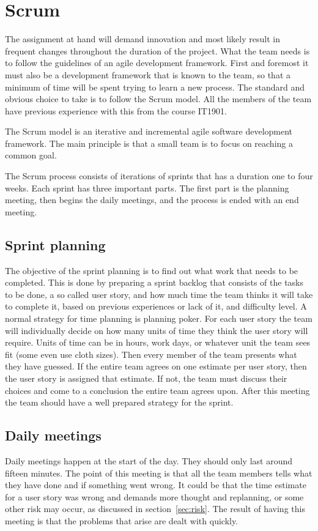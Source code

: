 \section{Scrum}

The assignment at hand will demand innovation and most likely result in frequent changes throughout the duration of the project.
What the team needs is to follow the guidelines of an agile development framework. First and foremost it must also be a development framework that is known to the team,
so that a minimum of time will be spent trying to learn a new process.
The standard and obvious choice to take is to follow the Scrum model. All the members of the team have previous experience with this from the course IT1901.

The Scrum model is an iterative and incremental agile software development framework.
The main principle is that a small team is to focus on reaching a common goal.

The Scrum process consists of iterations of sprints that has a duration one to four weeks. Each sprint has three important parts.
The first part is the planning meeting, then begins the daily  meetings, and the process is ended with an end meeting.

\subsection{Sprint planning}
The objective of the sprint planning is to find out what work that needs to be completed. This is done by preparing a
sprint backlog that consists of the tasks to be done, a so called user story, and how much time the team thinks it 
will take to complete it, based on previous experiences or lack of it, and difficulty level. A normal strategy for time planning is planning poker. 
For each user story the team will individually decide on how many units of time they think the user story will require. 
Units of time can be in hours, work days, or whatever unit the team sees fit (some even use cloth sizes).
Then every member of the team presents what they have guessed. If the entire team agrees on one estimate per user story,
then the user story is assigned that estimate. If not, the team must discuss their choices and come to a conclusion 
the entire team agrees upon.
After this meeting the team should have a well prepared strategy for the sprint.

\subsection{Daily meetings}
Daily meetings happen at the start of the day. They should only last around fifteen minutes. 
The point of this meeting is that all the team members tells what they have done and if something went wrong.
It could be that the time estimate for a user story was wrong and demands more thought and replanning, 
or some other risk may occur, as discussed in section~\ref{sec:risk}. 
The result of having this meeting is that the problems that arise are dealt with quickly.

